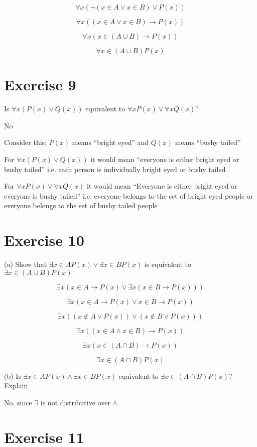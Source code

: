 \documentclass[11pt]{article}
\newcommand{\then}{\rightarrow}
\begin{document}
$$\forall x (\neg (x \in A \vee x \in B) \vee P(x))$$

$$\forall x ((x \in A \vee x \in B) \then P(x))$$

$$\forall x (x \in (A \cup B) \then P(x))$$

$$\forall x \in (A \cup B) P(x)$$

\section*{Exercise 9}

Is $\forall x (P(x) \vee Q(x))$ equivalent to 
$\forall x P(x) \vee \forall x Q(x)$?

No 

Consider this:
$P(x)$ means ``bright eyed'' and $Q(x)$ means ``bushy tailed''

For $\forall x (P(x) \vee Q(x))$ it would mean ``everyone is either bright eyed
or bushy tailed'' i.e. each person is individually bright eyed or bushy tailed 

For $\forall x P(x) \vee \forall x Q(x)$ it would mean ``Everyone is either
bright eyed or everyons is bushy tailed'' i.e. everyone belongs to the set of 
bright eyed people or everyone belongs to the set of bushy tailed people 

\section*{Exercise 10}

\noindent (a) Show that $\exists x \in A P(x) \vee \exists x \in B P(x)$ is 
equivalent to $\exists x \in (A \cup B) P(x)$

$$\exists x (x \in A \then P(x) \vee \exists x (x \in B \then P(x)))$$

$$\exists x (x \in A \then P(x) \vee x \in B \then P(x))$$

$$\exists x ((x \notin A \vee P(x)) \vee (x \notin B \vee P(x)))$$

$$\exists x ((x \in A \wedge x \in B) \then P(x))$$

$$\exists x (x \in (A \cap B) \then P(x))$$

$$\exists x \in (A \cap B) P(x)$$

\noindent (b) Is $\exists x \in A P(x) \wedge \exists x \in B P(x)$ equivalent 
to $\exists x \in (A \cap B) P(x)$? Explain

No, since $\exists$ is not distributive over $\wedge$

\section*{Exercise 11}
\end{document}

